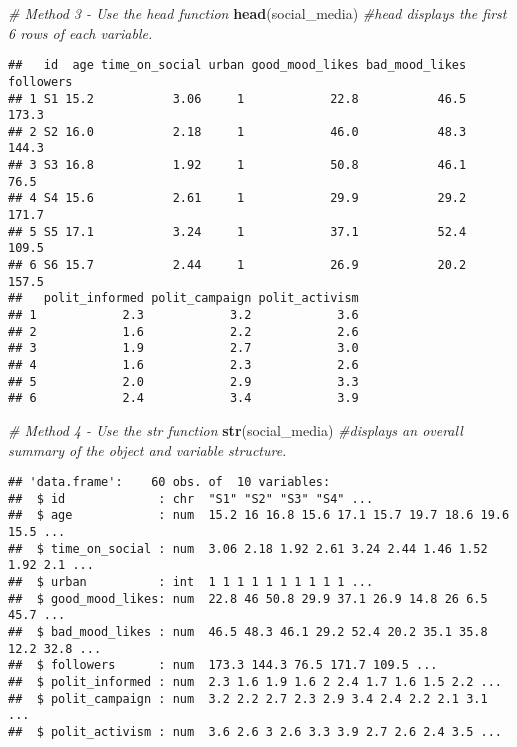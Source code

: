 \documentclass[
]{book}
\newenvironment{Shaded}{\begin{snugshade}}{\end{snugshade}}
\newcommand{\CommentTok}[1]{\textcolor[rgb]{0.56,0.35,0.01}{\textit{#1}}}
\newcommand{\FunctionTok}[1]{\textcolor[rgb]{0.13,0.29,0.53}{\textbf{#1}}}
\newcommand{\NormalTok}[1]{#1}
\begin{document}
\begin{Shaded}
\begin{Highlighting}[]
\CommentTok{\# Method 3 {-} Use the head function}
\FunctionTok{head}\NormalTok{(social\_media) }\CommentTok{\#head displays the first 6 rows of each variable.}
\end{Highlighting}
\end{Shaded}

\begin{verbatim}
##   id  age time_on_social urban good_mood_likes bad_mood_likes followers
## 1 S1 15.2           3.06     1            22.8           46.5     173.3
## 2 S2 16.0           2.18     1            46.0           48.3     144.3
## 3 S3 16.8           1.92     1            50.8           46.1      76.5
## 4 S4 15.6           2.61     1            29.9           29.2     171.7
## 5 S5 17.1           3.24     1            37.1           52.4     109.5
## 6 S6 15.7           2.44     1            26.9           20.2     157.5
##   polit_informed polit_campaign polit_activism
## 1            2.3            3.2            3.6
## 2            1.6            2.2            2.6
## 3            1.9            2.7            3.0
## 4            1.6            2.3            2.6
## 5            2.0            2.9            3.3
## 6            2.4            3.4            3.9
\end{verbatim}

\begin{Shaded}
\begin{Highlighting}[]
\CommentTok{\# Method 4 {-} Use the str function}
\FunctionTok{str}\NormalTok{(social\_media) }\CommentTok{\#displays an overall summary of the object and variable structure.}
\end{Highlighting}
\end{Shaded}

\begin{verbatim}
## 'data.frame':    60 obs. of  10 variables:
##  $ id             : chr  "S1" "S2" "S3" "S4" ...
##  $ age            : num  15.2 16 16.8 15.6 17.1 15.7 19.7 18.6 19.6 15.5 ...
##  $ time_on_social : num  3.06 2.18 1.92 2.61 3.24 2.44 1.46 1.52 1.92 2.1 ...
##  $ urban          : int  1 1 1 1 1 1 1 1 1 1 ...
##  $ good_mood_likes: num  22.8 46 50.8 29.9 37.1 26.9 14.8 26 6.5 45.7 ...
##  $ bad_mood_likes : num  46.5 48.3 46.1 29.2 52.4 20.2 35.1 35.8 12.2 32.8 ...
##  $ followers      : num  173.3 144.3 76.5 171.7 109.5 ...
##  $ polit_informed : num  2.3 1.6 1.9 1.6 2 2.4 1.7 1.6 1.5 2.2 ...
##  $ polit_campaign : num  3.2 2.2 2.7 2.3 2.9 3.4 2.4 2.2 2.1 3.1 ...
##  $ polit_activism : num  3.6 2.6 3 2.6 3.3 3.9 2.7 2.6 2.4 3.5 ...
\end{verbatim}
\end{document}
